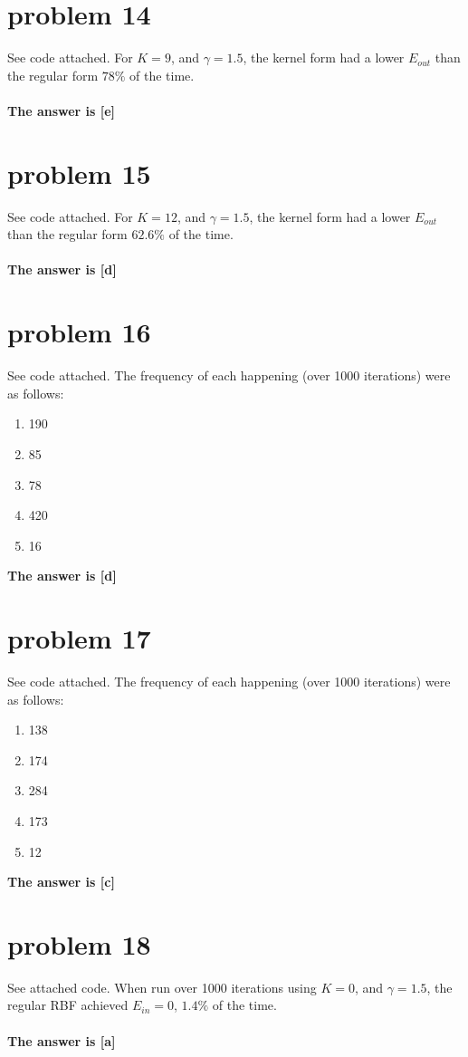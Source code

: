 \documentclass{article}
\begin{document}
\section*{problem 14}
See code attached. For $K=9$, and $\gamma = 1.5$, the kernel form had a lower $E_{out}$ than the regular form $78\%$ of the time.\\\\
\textbf{The answer is [e]}

\section*{problem 15} 
See code attached. For $K=12$, and $\gamma = 1.5$, the kernel form had a lower $E_{out}$ than the regular form $62.6\%$ of the time.\\\\
\textbf{The answer is [d]}

\section*{problem 16}
See code attached. The frequency of each happening (over 1000 iterations) were as follows:\\
\begin{enumerate}[label = (\alph*)]
    \item 190
    \item 85
    \item 78
    \item 420
    \item 16
\end{enumerate}
\textbf{The answer is [d]}

\section*{problem 17}
See code attached. The frequency of each happening (over 1000 iterations) were as follows:
\begin{enumerate}[label = (\alph*)]
    \item 138
    \item 174
    \item 284
    \item 173
    \item 12
\end{enumerate}
\textbf{The answer is [c]}

\section*{problem 18} 
See attached code. When run over 1000 iterations using $K=0$, and $\gamma=1.5$, the regular RBF achieved $E_{in} = 0$, $1.4\%$ of the time.\\\\
\textbf{The answer is [a]}
\end{document}
